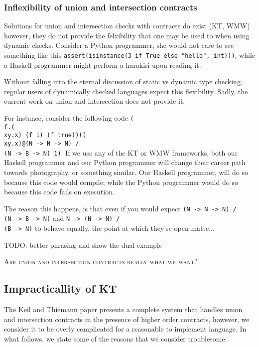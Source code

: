 \subsubsection*{Inflexibility of union and intersection contracts}

Solutions for union and intersection checks with contracts do exist (KT, WMW) however,
they do not provide the felxibility that one may be used to when using dynamic checks.
Consider a Python programmer, she would not care to see something like this
\texttt{assert(isinstance(3 if True else "hello", int)))}, while a Haskell programmer
might perform a harakiri upon reading it.

Without falling into the eternal discussion of static vs dynamic type checking,
regular users of dynamically checked languages expect this flexibility.
Sadly, the current work on union and intersection does not provide it.

For instance, consider the following code
\texttt{(\\f.(\\xy.x) (f 1) (f true))((\\xy.x)@(N -> N -> N) /\\ (N -> B -> N) 1)}.
If we use any of the KT or WMW frameworks, both our Haskell programmer and our
Python programmer will change their career path towards photography, or something
similar.
Our Haskell programmer, will do so because this code would compile;
while the Python programmer would do so because this code fails on execution.

The reason this happens, is that even if you would expect
\texttt{(N -> N -> N) /\\ (N -> B -> N)}
and \texttt{N -> (N -> N) /\\ (B -> N)} to behave equally, the point at which
they're open matte...


TODO: better phrasing and show the dual example

\textsc{Are union and intersection contracts really what we want?}

\subsection{Impracticallity of KT}

The Keil and Thiemann paper presents a complete system that handles union and intersection
contracts in the presence of higher order contracts, however, we consider it to be overly
complicated for a reasonable to implement language.
In what follows, we state some of the reasons that we consider troublesome.


